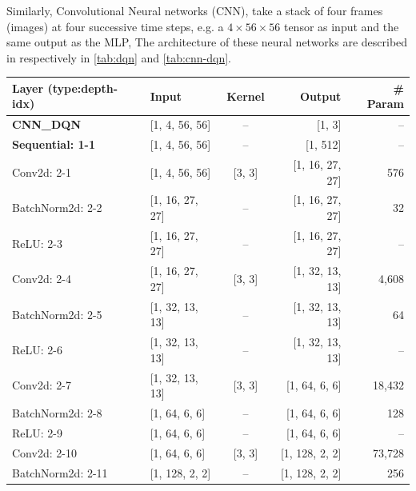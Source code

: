 Similarly, Convolutional Neural networks (CNN), take a stack of four frames (images) at four successive time steps, e.g. a $4\times56\times56$ tensor as input and the same output as the MLP, The architecture of these neural networks are described in respectively in \ref{tab:dqn} and \ref{tab:cnn-dqn}.

\begin{table}
	\centering
	\begin{adjustbox}{max width=\linewidth}
	\begin{tabular}{@{}llcrr@{}}
		\toprule
		Layer (type:depth-idx) & Input& Kernel& Output & \# Param \\
		\midrule
		\textbf{CNN\_DQN}                                   & [1, 4, 56, 56]   & --            & [1, 3]           & --     \\
		\quad \textbf{Sequential: 1-1}                   & [1, 4, 56, 56]   & --            & [1, 512]         & --     \\
		\quad \quad Conv2d: 2-1                  & [1, 4, 56, 56]   & [3, 3]        & [1, 16, 27, 27]  & 576    \\
		\quad \quad BatchNorm2d: 2-2             & [1, 16, 27, 27]  & --            & [1, 16, 27, 27]  & 32     \\
		\quad \quad ReLU: 2-3                    & [1, 16, 27, 27]  & --            & [1, 16, 27, 27]  & --     \\
		\quad \quad Conv2d: 2-4                  & [1, 16, 27, 27]  & [3, 3]        & [1, 32, 13, 13]  & 4,608  \\
		\quad \quad BatchNorm2d: 2-5             & [1, 32, 13, 13]  & --            & [1, 32, 13, 13]  & 64     \\
		\quad \quad ReLU: 2-6                    & [1, 32, 13, 13]  & --            & [1, 32, 13, 13]  & --     \\
		\quad \quad Conv2d: 2-7                  & [1, 32, 13, 13]  & [3, 3]        & [1, 64, 6, 6]    & 18,432 \\
		\quad \quad BatchNorm2d: 2-8             & [1, 64, 6, 6]    & --            & [1, 64, 6, 6]    & 128    \\
		\quad \quad ReLU: 2-9                    & [1, 64, 6, 6]    & --            & [1, 64, 6, 6]    & --     \\
		\quad \quad Conv2d: 2-10                 & [1, 64, 6, 6]    & [3, 3]        & [1, 128, 2, 2]   & 73,728 \\
		\quad \quad BatchNorm2d: 2-11            & [1, 128, 2, 2]   & --            & [1, 128, 2, 2]   & 256    \\

\end{tabular}
\end{adjustbox}
\end{table}

